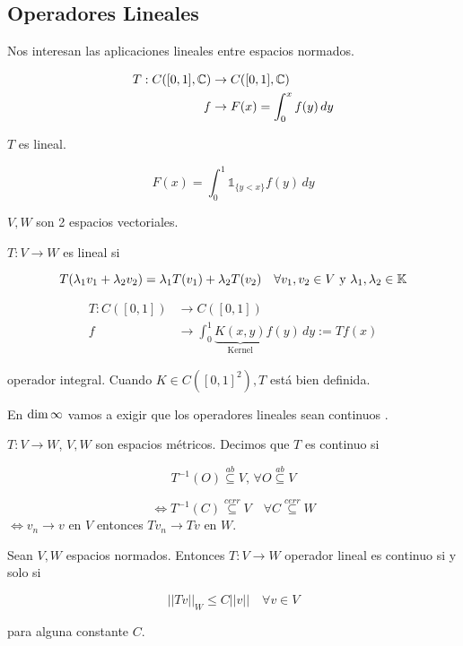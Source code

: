 \subsection{Operadores Lineales}

Nos interesan las aplicaciones lineales entre espacios normados.

\begin{fexample}
    \begin{align*}T:C([0,1],\mathbb{C})&\to C([0,1],\mathbb{C})\\
    f&\to F(x)=\int_0^x f(y)\, dy\end{align*}

    $T$ es lineal.

    \[F(x)=\int_0^1 \mathds{1}_{\{y<x\}} f(y)\,dy\]
\end{fexample}

\begin{fdefinition}
    $V,W$ son 2 espacios vectoriales.

    $T:V\to W$ es lineal si 

    \[T(\lambda_1 v_1+\lambda_2 v_2)=\lambda_1 T(v_1)+\lambda_2 T(v_2)\quad \forall v_1,v_2\in V\text{ y } \lambda_1,\lambda_2\in \mathbb{K}\]

\end{fdefinition}

\begin{align*}T:C([0,1])&\to C([0,1])\\
f&\to \int_0^1 \underbrace{K(x,y)}_{\text{Kernel}} f(y)\,dy:=Tf(x)\end{align*}

operador integral. Cuando $K\in C([0,1]^2), T$ está bien definida.

En $\operatorname{dim} \infty$ vamos a exigir que los operadores lineales sean \color{red} continuos \color{black}.

\begin{fdefinition}
    $T:V\to W$, $V,W$ son espacios métricos. Decimos que $T$ es continuo si
    
    \[T^{-1}(O)\overset{ab}{\subseteq} V,\, \forall O\overset{ab}{\subseteq} V\]

    \[\iff T^{-1}(C)\overset{cerr}{\subseteq} V\quad \forall C\overset{cerr}{\subseteq} W\]
    $\iff v_n\to v$ en $V$ entonces $Tv_n\to Tv$ en $W$.
\end{fdefinition}

\begin{ftheorem}
    Sean $V,W$ espacios normados. Entonces $T:V\to W$ operador lineal es continuo si y solo si

    \begin{equation}||Tv||_W\leq C||v||\quad \forall v\in V \end{equation}

    para alguna constante $C$.
\end{ftheorem}

